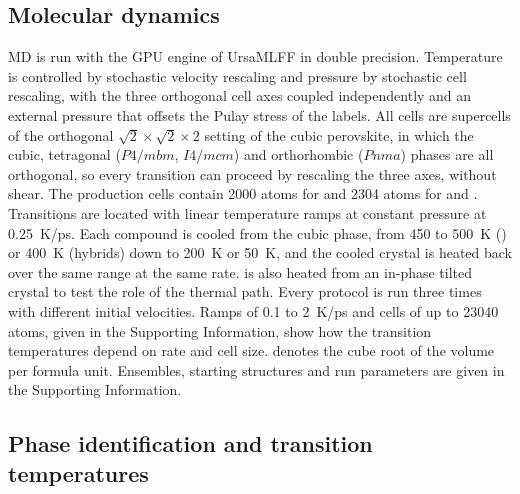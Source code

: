 \subsection{Molecular dynamics}
\label{sec:md}

{\changedcolor
MD is run with the GPU engine of UrsaMLFF in double precision. Temperature is controlled by stochastic velocity
rescaling\cite{Bussi2007JCP} and pressure by stochastic cell rescaling,\cite{Bernetti2020JCP} with the three orthogonal
cell axes coupled independently and an external pressure that offsets the Pulay stress of the labels. All cells are
supercells of the orthogonal $\sqrt{2}\times\sqrt{2}\times2$ setting of the cubic perovskite, in which the cubic,
tetragonal ($P4/mbm$, $I4/mcm$) and orthorhombic ($Pnma$) phases are all orthogonal, so every transition can proceed
by rescaling the three axes, without shear. The production cells contain 2000 atoms for \CsSnI{} and 2304 atoms for
\MASnI{} and \FASnI{}. Transitions are located with linear temperature ramps at constant pressure at \SI{0.25}{K/ps}.
Each compound is cooled from the cubic phase, from 450 to \SI{500}{K} (\CsSnI{}) or \SI{400}{K} (hybrids) down to
\SI{200}{K} or \SI{50}{K}, and the cooled crystal is heated back over the same range at the same rate. \MASnI{} is also heated from an in-phase tilted crystal to test the role of the thermal path. Every protocol is run
three times with different initial velocities. Ramps of 0.1 to \SI{2}{K/ps} and cells of up to \num{23040} atoms,
given in the Supporting Information, show how the transition temperatures depend on rate and cell size.
\apc{} denotes the cube root of the volume per formula unit. Ensembles, starting structures and run parameters are
given in the Supporting Information.
}

\subsection{Phase identification and transition temperatures}
\label{sec:phaseid}

